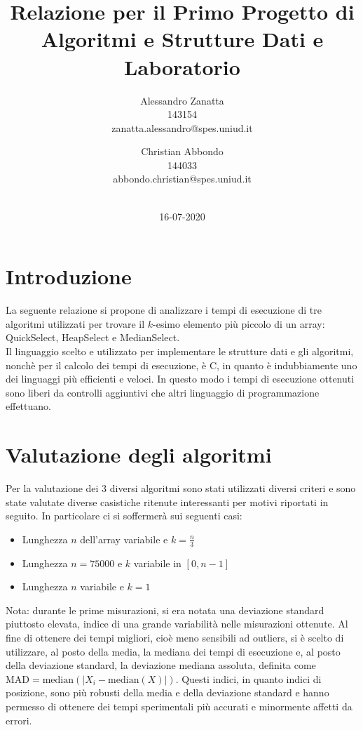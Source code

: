 \documentclass{article}
\title{Relazione per il Primo Progetto di Algoritmi e Strutture Dati e Laboratorio}
\date{16-07-2020}
\author{Alessandro Zanatta \\ 143154 \\ zanatta.alessandro@spes.uniud.it\\ \and Christian Abbondo \\ 144033 \\ abbondo.christian@spes.uniud.it\\ \\}
\begin{document}
	\maketitle
	\newpage
	
	
	\tableofcontents	
	\newpage
	
	\section{Introduzione}
	La seguente relazione si propone di analizzare i tempi di esecuzione di tre algoritmi utilizzati per trovare il $ k $-esimo elemento più piccolo di un array: QuickSelect, HeapSelect e MedianSelect.
	\\ 
	Il linguaggio scelto e utilizzato per implementare le strutture dati e gli algoritmi, nonchè per il calcolo dei tempi di esecuzione, è C, in quanto è indubbiamente uno dei linguaggi più efficienti e veloci. In questo modo i tempi di esecuzione ottenuti sono liberi da controlli aggiuntivi che altri linguaggio di programmazione effettuano.
	\newpage
	
	
	\section{Valutazione degli algoritmi}
	Per la valutazione dei 3 diversi algoritmi sono stati utilizzati diversi criteri e sono state valutate diverse casistiche ritenute interessanti per motivi riportati in seguito. In particolare ci si soffermerà sui seguenti casi:
	
	\begin{itemize}
		\item Lunghezza $n$ dell'array variabile e $k=\frac{n}{3}$
		\item Lunghezza $n=75000$ e $k$ variabile in $[0,n-1]$
		\item Lunghezza $n$ variabile e $k=1$
	\end{itemize}
	
	Nota: durante le prime misurazioni, si era notata una deviazione standard piuttosto elevata, indice di una grande variabilità nelle misurazioni ottenute. Al fine di ottenere dei tempi migliori, cioè meno sensibili ad outliers, si è scelto di utilizzare, al posto della media, la mediana dei tempi di esecuzione e, al posto della deviazione standard, la deviazione mediana assoluta, definita come $\textrm{MAD}=\textrm{median}\left(\mathopen|X_{i}-\textrm{median}\left(X\right)\mathopen|\right)$. Questi indici, in quanto indici di posizione, sono più robusti della media e della deviazione standard e hanno permesso di ottenere dei tempi sperimentali più accurati e minormente affetti da errori.
	\newpage
	
\end{document}
